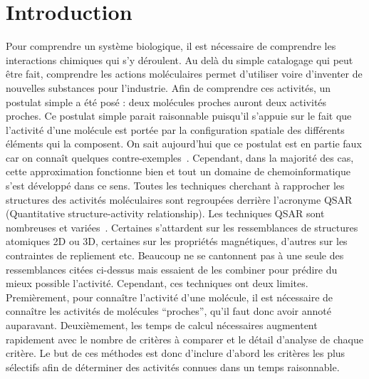 

\section{Introduction}

Pour comprendre un système biologique, il est nécessaire de comprendre les interactions chimiques qui s'y déroulent.
Au delà du simple catalogage qui peut être fait, comprendre les actions moléculaires permet d'utiliser voire d'inventer de nouvelles substances pour l'industrie.
Afin de comprendre ces activités, un postulat simple a été posé : deux molécules proches auront deux activités proches.
Ce postulat simple parait raisonnable puisqu'il s'appuie sur le fait que l'activité d'une molécule est portée par la configuration spatiale des différents éléments qui la composent.
On sait aujourd'hui que ce postulat est en partie faux car on connaît quelques contre-exemples~\cite{patani_bioisosterism:_1996}.
Cependant, dans la majorité des cas, cette approximation fonctionne bien et tout un domaine de chemoinformatique s'est développé dans ce sens.
Toutes les techniques cherchant à rapprocher les structures des activités moléculaires sont regroupées derrière l'acronyme QSAR (Quantitative structure-activity relationship).
Les techniques QSAR sont nombreuses et variées~\cite{patani_bioisosterism:_1996,leach_molecular_2001,helma_predictive_2005}.
Certaines s'attardent sur les ressemblances de structures atomiques 2D ou 3D, certaines sur les propriétés magnétiques, d'autres sur les contraintes de repliement etc.
Beaucoup ne se cantonnent pas à une seule des ressemblances citées ci-dessus mais essaient de les combiner pour prédire du mieux possible l'activité.
Cependant, ces techniques ont deux limites.
Premièrement, pour connaître l'activité d'une molécule, il est nécessaire de connaître les activités de molécules ``proches'', qu'il faut donc avoir annoté auparavant.
Deuxièmement, les temps de calcul nécessaires augmentent rapidement avec le nombre de critères à comparer et le détail d'analyse de chaque critère.
Le but de ces méthodes est donc d'inclure d'abord les critères les plus sélectifs afin de déterminer des activités connues dans un temps raisonnable.

